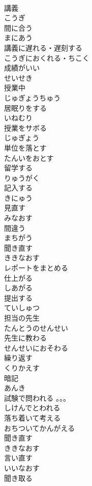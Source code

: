 \documentclass[8pt]{extreport}
\begin{document}
\begin{CJK}{UTF8}{min}
\\	講義	
\\	こうぎ
\\	間に合う	
\\	まにあう
\\	講義に遅れる・遅刻する	
\\	こうぎにおくれる・ちこく
\\	成績がいい	
\\	せいせき
\\	授業中	
\\	じゅぎょうちゅう
\\	居眠りをする	
\\	いねむり
\\	授業をサボる	
\\	じゅぎょう
\\	単位を落とす	
\\	たんいをおとす
\\	留学する	
\\	りゅうがく
\\	記入する	
\\	きにゅう
\\	見直す	
\\	みなおす
\\	間違う	
\\	まちがう
\\	聞き直す	
\\	ききなおす
\\	レポートをまとめる	
\\	仕上がる	
\\	しあがる
\\	提出する	
\\	ていしゅつ
\\	担当の先生	
\\	たんとうのせんせい
\\	先生に教わる	
\\	せんせいにおそわる
\\	繰り返す	
\\	くりかえす
\\	暗記	
\\	あんき
\\	試験で問われる	。。。
\\	しけんでとわれる
\\	落ち着いて考える	
\\	おちついてかんがえる
\\	聞き直す	
\\	ききなおす
\\	言い直す	
\\	いいなおす
\\	聞き取る	

\end{CJK}
\end{document}
